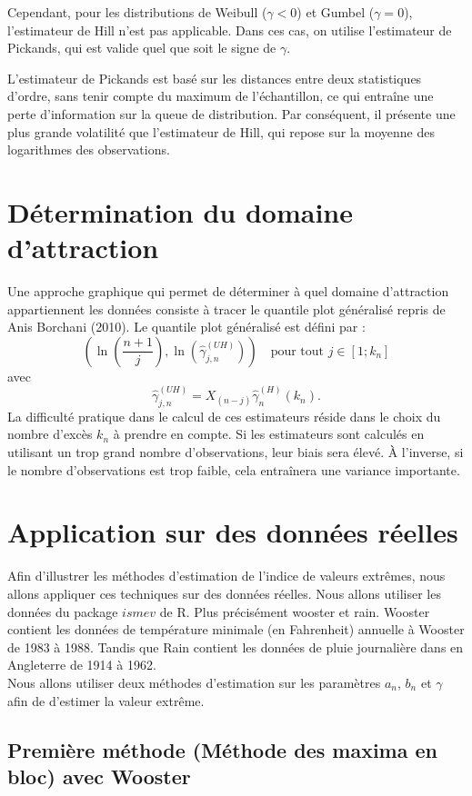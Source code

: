 \documentclass{article}
\begin{document}
Cependant, pour les distributions de Weibull (\(\gamma < 0\)) et Gumbel (\(\gamma = 0\)), l’estimateur de Hill n’est pas applicable. Dans ces cas, on utilise l’estimateur de Pickands, qui est valide quel que soit le signe de \( \gamma \).  

L'estimateur de Pickands est basé sur les distances entre deux statistiques d'ordre, sans tenir compte du maximum de l’échantillon, ce qui entraîne une perte d'information sur la queue de distribution. Par conséquent, il présente une plus grande volatilité que l'estimateur de Hill, qui repose sur la moyenne des logarithmes des observations.

\section{Détermination du domaine d'attraction}
Une approche graphique qui permet de déterminer à quel domaine d'attraction appartiennent les données consiste à tracer le quantile plot généralisé repris de Anis Borchani (2010). Le quantile plot généralisé est défini par :
\[
\left( \ln\left( \frac{n+1}{j} \right), \ln\left( \hat{\gamma}_{j,n}^{(UH)} \right) \right) \quad \text{pour tout } j \in \left[ 1; k_n \right]
\]
avec 
\[
\hat{\gamma}_{j,n}^{(UH)} = X_{(n-j)} \hat{\gamma}_{n}^{(H)}(k_n).
\]
La difficulté pratique dans le calcul de ces estimateurs réside dans le choix du nombre d'excès \(k_n\) à prendre en compte. Si les estimateurs sont calculés en utilisant un trop grand nombre d'observations, leur biais sera élevé. À l'inverse, si le nombre d'observations est trop faible, cela entraînera une variance importante.
\newpage
\section{Application sur des données réelles}

Afin d'illustrer les méthodes d'estimation de l'indice de valeurs extrêmes, nous allons appliquer ces techniques sur des données réelles.
Nous allons utiliser les données du package $ismev$ de R. Plus précisément wooster et rain. Wooster contient les données de température minimale (en Fahrenheit) annuelle à Wooster de 1983 à 1988.
Tandis que Rain contient les données de pluie journalière dans en Angleterre de 1914 à 1962.
\\
Nous allons utiliser deux méthodes d'estimation sur les paramètres $a_n$, $b_n$ et $\gamma$ afin de d'estimer la valeur extrême.

\subsection{Première méthode (Méthode des maxima en bloc) avec Wooster}
\end{document}
